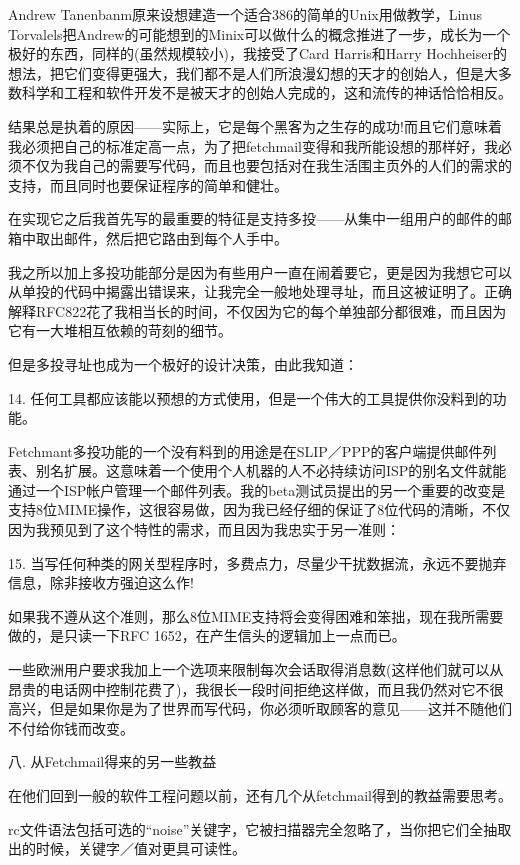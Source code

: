 \documentclass[a4paper,12pt,UTF8,twoside]{ctexbook}
\begin{document}
Andrew Tanenbanm原来设想建造一个适合386的简单的Unix用做教学，Linus Torvalels把Andrew的可能想到的Minix可以做什么的概念推进了一步，成长为一个极好的东西，同样的(虽然规模较小)，我接受了Card Harris和Harry Hochheiser的想法，把它们变得更强大，我们都不是人们所浪漫幻想的天才的创始人，但是大多数科学和工程和软件开发不是被天才的创始人完成的，这和流传的神话恰恰相反。


结果总是执着的原因——实际上，它是每个黑客为之生存的成功!而且它们意味着我必须把自己的标准定高一点，为了把fetchmail变得和我所能设想的那样好，我必须不仅为我自己的需要写代码，而且也要包括对在我生活围主页外的人们的需求的支持，而且同时也要保证程序的简单和健壮。


在实现它之后我首先写的最重要的特征是支持多投——从集中一组用户的邮件的邮箱中取出邮件，然后把它路由到每个人手中。


我之所以加上多投功能部分是因为有些用户一直在闹着要它，更是因为我想它可以从单投的代码中揭露出错误来，让我完全一般地处理寻址，而且这被证明了。正确解释RFC822花了我相当长的时间，不仅因为它的每个单独部分都很难，而且因为它有一大堆相互依赖的苛刻的细节。


但是多投寻址也成为一个极好的设计决策，由此我知道：


14. 任何工具都应该能以预想的方式使用，但是一个伟大的工具提供你没料到的功能。


Fetchmant多投功能的一个没有料到的用途是在SLIP／PPP的客户端提供邮件列表、别名扩展。这意味着一个使用个人机器的人不必持续访问ISP的别名文件就能通过一个ISP帐户管理一个邮件列表。我的beta测试员提出的另一个重要的改变是支持8位MIME操作，这很容易做，因为我已经仔细的保证了8位代码的清晰，不仅因为我预见到了这个特性的需求，而且因为我忠实于另一准则：


15. 当写任何种类的网关型程序时，多费点力，尽量少干扰数据流，永远不要抛弃信息，除非接收方强迫这么作!


如果我不遵从这个准则，那么8位MIME支持将会变得困难和笨拙，现在我所需要做的，是只读一下RFC 1652，在产生信头的逻辑加上一点而已。


一些欧洲用户要求我加上一个选项来限制每次会话取得消息数(这样他们就可以从昂贵的电话网中控制花费了)，我很长一段时间拒绝这样做，而且我仍然对它不很高兴，但是如果你是为了世界而写代码，你必须听取顾客的意见——这并不随他们不付给你钱而改变。


八. 从Fetchmail得来的另一些教益


在他们回到一般的软件工程问题以前，还有几个从fetchmail得到的教益需要思考。


rc文件语法包括可选的“noise”关键字，它被扫描器完全忽略了，当你把它们全抽取出的时候，关键字／值对更具可读性。
\end{document}
